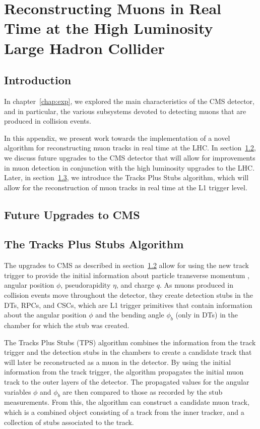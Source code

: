 
\chapter{Reconstructing Muons in Real Time at the High Luminosity Large Hadron Collider}
\label{chap:TPSAppendix}

\section{Introduction}

In chapter~\ref{chap:exp}, we explored the main characteristics of the CMS detector, and in particular, the various subsystems devoted to detecting muons that are produced in collision events.

In this appendix, we present work towards the implementation of a novel algorithm for reconstructing muon tracks in real time at the LHC.
In section~\ref{sec:CMSUpgrade}, we discuss future upgrades to the CMS detector that will allow for improvements in muon detection in conjunction with the high luminosity upgrades to the LHC.
Later, in section~\ref{sec:TPS}, we introduce the Tracks Plus Stubs algorithm, which will allow for the reconstruction of muon tracks in real time at the L1 trigger level.

\section{Future Upgrades to CMS}
\label{sec:CMSUpgrade}

\section{The Tracks Plus Stubs Algorithm}
\label{sec:TPS}

The upgrades to CMS as described in section~\ref{sec:CMSUpgrade} allow for using the new track trigger to provide the initial information about particle transverse momentum \pt, angular position $\phi$, pseudorapidity $\eta$, and charge $q$.
As muons produced in collision events move throughout the detector, they create detection stubs in the DTs, RPCs, and CSCs, which are L1 trigger primitives that contain information about the angular position $\phi$ and the bending angle $\phi_b$ (only in DTs) in the chamber for which the stub was created.

The Tracks Plus Stubs (TPS) algorithm combines the information from the track trigger and the detection stubs in the chambers to create a candidate track that will later be reconstructed as a muon in the detector.
By using the initial information from the track trigger, the algorithm propagates the initial muon track to the outer layers of the detector.
The propagated values for the angular variables $\phi$ and $\phi_b$ are then compared to those as recorded by the stub measurements.
From this, the algorithm can construct a candidate muon track, which is a combined object consisting of a track from the inner tracker, and a collection of stubs associated to the track.

